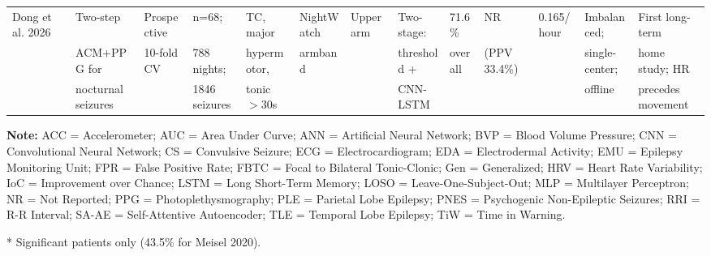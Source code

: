 \documentclass[10pt,a4paper]{article}
\begin{document}
\begin{longtable}{p{2.5cm}p{2cm}p{2cm}p{1.8cm}p{2cm}p{2cm}p{1.2cm}p{2.5cm}p{1.5cm}p{1.5cm}p{1.5cm}p{2cm}p{2.5cm}}
Dong et al. 2026 & Two-step & Prospective & n=68; & TC, major & NightWatch & Upper arm & Two-stage: & 71.6\% & NR & 0.165/hour & Imbalanced; & First long-term \\[2pt]
& ACM+PPG for & 10-fold CV & 788 nights; & hypermotor, & armband & & threshold + & overall & (PPV 33.4\%) & & single-center; & home study; HR \\[2pt]
& nocturnal seizures & & 1846 seizures & tonic $>$30s & & & CNN-LSTM & & & & offline & precedes movement \\

\bottomrule
\end{longtable}

\begin{threeparttable}
\small
\item[] \textbf{Note:} ACC = Accelerometer; AUC = Area Under Curve; ANN = Artificial Neural Network; BVP = Blood Volume Pressure; CNN = Convolutional Neural Network; CS = Convulsive Seizure; ECG = Electrocardiogram; EDA = Electrodermal Activity; EMU = Epilepsy Monitoring Unit; FPR = False Positive Rate; FBTC = Focal to Bilateral Tonic-Clonic; Gen = Generalized; HRV = Heart Rate Variability; IoC = Improvement over Chance; LSTM = Long Short-Term Memory; LOSO = Leave-One-Subject-Out; MLP = Multilayer Perceptron; NR = Not Reported; PPG = Photoplethysmography; PLE = Parietal Lobe Epilepsy; PNES = Psychogenic Non-Epileptic Seizures; RRI = R-R Interval; SA-AE = Self-Attentive Autoencoder; TLE = Temporal Lobe Epilepsy; TiW = Time in Warning.
\item[] * Significant patients only (43.5\% for Meisel 2020).
\end{threeparttable}
\end{document}
